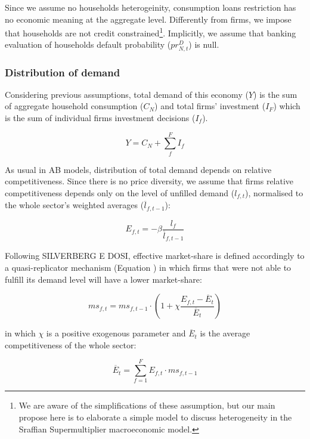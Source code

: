 \documentclass{SelfArx}
\begin{document}
Since we assume no households heterogeinity, consumption loans restriction has no economic meaning at the aggregate level.
Differently from firms, we impose that households are not credit constrained\footnote{We are aware of the simplifications of these assumption, but our main propose here is to elaborate a simple model to discuss heterogeneity in the Sraffian Supermultiplier macroeconomic model.}.
Implicitly, we assume that banking evaluation of households default probability (\(pr^{D}_{N,t}\)) is null.

\subsubsection{Distribution of demand}
\label{sec:org28bdf26}


Considering previous assumptions, total demand of this economy (\(Y\)) is the sum of aggregate household consumption (\(C_{N}\)) and total firms' investment (\(I_{F}\)) which is the sum of individual firms investment decisions (\(I_{f}\)).
\begin{latex}
\begin{equation}
\label{Ch_super_EQ_GDP_D}
Y = C_{N} + \sum_{f}^{F} I_{f}
\end{equation}
\end{latex}
As usual in AB models, distribution of total demand depends on relative competitiveness.
Since there is no price diversity, we assume that firms relative competitiveness depends only on the level of unfilled demand (\(l_{f,t}\)), normalised to the whole sector’s weighted averages (\(\overline{l}_{f,t-1}\)):

\begin{latex}
\begin{equation}
E_{f,t} = -\beta \frac{l_{f}}{\overline{l}_{f,t-1}}
\end{equation}
\end{latex}
Following SILVERBERG E DOSI, effective market-share is defined accordingly to a quasi-replicator mechanism (Equation ) in which firms that were not able to fulfill its demand level will have a lower market-share:
\begin{latex}
\begin{equation}
\label{Ch_super_EQ_Replicator}
ms_{f,t} = ms_{f,t-1}\cdot \left(1+\chi \frac{E_{f,t} - \overline{E}_{t}}{\overline{E}_{t}}\right)
\end{equation}
\end{latex}
in which \(\chi\) is a positive exogenous parameter and \(\overline{E}_{t}\) is the average competitiveness of the whole sector:
\begin{latex}
\begin{equation}
\overline{E}_{t} = \sum_{f=1}^{F}E_{f,t}\cdot ms_{f,t-1}
\end{equation}
\end{latex}
\end{document}
